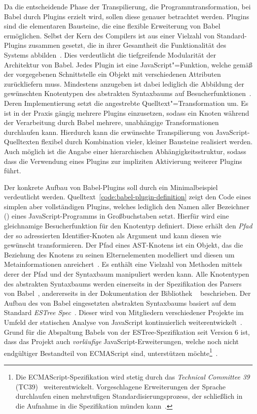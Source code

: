 Da die entscheidende Phase der Transpilierung, die Programmtransformation, bei Babel durch Plugins erzielt wird, sollen diese genauer betrachtet werden. Plugins sind die elementaren Bausteine, die eine flexible Erweiterung von Babel ermöglichen. Selbst der Kern des Compilers ist aus einer Vielzahl von Standard-Plugins zusammen gesetzt, die in ihrer Gesamtheit die Funktionalität des Systems abbilden~\autocite{BABEL}. Dies verdeutlicht die tiefgreifende Modularität der Architektur von Babel. Jedes Plugin ist eine JavaScript"=Funktion, welche gemäß der vorgegebenen Schnittstelle ein Objekt mit verschiedenen Attributen zurückliefern muss. Mindestens anzugeben ist dabei lediglich die Abbildung der gewünschten Knotentypen des abstrakten Syntaxbaums auf Besucherfunktionen~\autocite{BABEL:HANDBOOK}. Deren Implementierung setzt die angestrebte Quelltext"=Transformation um. Es ist in der Praxis gängig mehrere Plugins einzusetzen, sodass ein Knoten während der Verarbeitung durch Babel mehrere, unabhängige Transformationen durchlaufen kann. Hierdurch kann die erwünschte Transpilierung von JavaScript-Quelltexten flexibel durch Kombination vieler, kleiner Bausteine realisiert werden. Auch möglich ist die Angabe einer hierarchischen Abhängigkeitsstruktur, sodass dass die Verwendung eines Plugins zur impliziten Aktivierung weiterer Plugins führt.

Der konkrete Aufbau von Babel-Plugins soll durch ein Minimalbeispiel verdeutlicht werden. Quelltext~\ref{code:babel-plugin-definition} zeigt den Code eines simplen aber vollständigen Plugins, welches lediglich den Namen aller Bezeichner () eines JavaScript-Programms in Großbuchstaben setzt. Hierfür wird eine gleichnamige Besucherfunktion für den Knotentyp  definiert. Diese erhält den \emph{Pfad} der so adressierten Identifier-Knoten als Argument und kann diesen wie gewünscht transformieren. Der Pfad eines AST-Knotens ist ein Objekt, das die Beziehung des Knotens zu seinen Elternelementen modelliert und diesen um Metainformationen anreichert~\autocite{BABEL:HANDBOOK}. Es enthält eine Vielzahl von Methoden mittels derer der Pfad und der Syntaxbaum manipuliert werden kann.
Alle Knotentypen des abstrakten Syntaxbaums werden einerseits in der Spezifikation des Parsers von Babel~\autocite{BABEL:PARSER_SPEC,BABEL:PARSER}, andererseits in der Dokumentation der Bibliothek ~\autocite{BABEL:TYPES} beschrieben. Der Aufbau des von Babel eingesetzten abstrakten Syntaxbaums basiert auf dem Standard \textit{ESTree Spec}~\autocite{ESTREE_SPEC}. Dieser wird von Mitgliedern verschiedener Projekte im Umfeld der statischen Analyse von JavaScript kontinuierlich weiterentwickelt~\autocite{BABEL:PARSER,ESTREE_SPEC}. Grund für die Abspaltung Babels von der ESTree-Spezifikation seit Version 6 ist, dass das Projekt auch \emph{vorläufige} JavaScript-Erweiterungen, welche noch nicht endgültiger Bestandteil von ECMAScript sind, unterstützen möchte\footnote{Die ECMAScript-Spezifikation wird stetig durch das \textit{Technical Committee 39} (TC39)~\autocite{TC39_COMMITTEE} weiterentwickelt. Vorgeschlagene Erweiterungen der Sprache durchlaufen einen mehrstufigen Standardisierungsprozess, der schließlich in die Aufnahme in die Spezifikation münden kann~\autocite{TC39_PROCESS}.}~\autocite{BABEL:STATE_OF_BABEL}.

